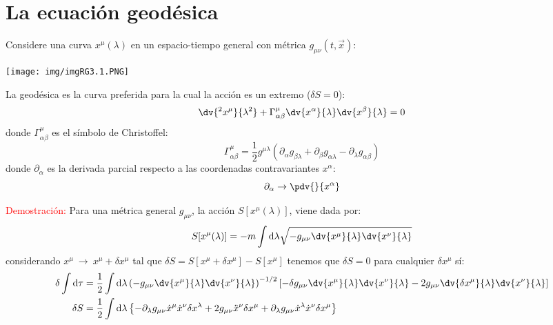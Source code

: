 \documentclass[../main]{subfiles}
\begin{document}
\section{La ecuación geodésica}
Considere una curva $x^{\mu}(\lambda)$ en un espacio-tiempo general con métrica $g_{\mu\nu}(t, \vec{x})$:
\begin{center}
    \texttt{[image: img/imgRG3.1.PNG]}
\end{center}
 La geodésica es la curva preferida para la cual la acción es un extremo ($\delta S=0$):
\begin{equation}
    \dv{^2 x^{\mu}}{\lambda^2}+\Gamma^{\mu}_{\alpha\beta}\dv{x^{\alpha}}{\lambda}\dv{x^{\beta}}{\lambda}=0
\end{equation}
donde $\Gamma^{\mu}_{\alpha\beta}$ es el símbolo de Christoffel:
\begin{equation}
    \Gamma^{\mu}_{\alpha\beta}=\dfrac{1}{2}g^{\mu\lambda}(\partial_{\alpha}g_{\beta\lambda}+\partial_{\beta}g_{\alpha\lambda}-\partial_{\lambda}g_{\alpha\beta})
\end{equation}
donde $\partial_{\alpha}$ es la derivada parcial respecto a las coordenadas contravariantes $x^{\alpha}$:
\begin{equation}
    \partial_{\alpha} \rightarrow \pdv{}{x^{\alpha}}
\end{equation}

\textcolor{red}{Demostración:} Para una métrica general $g_{\mu\nu}$, la acción $S[x^{\mu}(\lambda)]$, viene dada por:
\begin{equation}
    S[x^{\mu}(\lambda)]=-m\int \mathrm{d}\lambda \sqrt{-g_{\mu\nu}\dv{x^{\mu}}{\lambda}\dv{x^{\nu}}{\lambda}}
\end{equation}
considerando $x^{\mu} \ \rightarrow \ x^{\mu}+\delta x^{\mu}$ tal que $\delta S=S[x^{\mu}+\delta x^{\mu}]-S[x^{\mu}]$ tenemos que $\delta S=0$ para cualquier $\delta x^{\mu}$ sí:
\begin{equation}
    \begin{split}
        \delta \int \mathrm{d}\tau&=\dfrac{1}{2}\int \mathrm{d}\lambda \left(-g_{\mu\nu}\dv{x^{\mu}}{\lambda}\dv{x^{\nu}}{\lambda}\right)^{-1/2} \left[-\delta g_{\mu\nu} \dv{x^{\mu}}{\lambda}\dv{x^{\nu}}{\lambda}-2g_{\mu\nu}\dv{\delta x^{\mu}}{\lambda}\dv{x^{\nu}}{\lambda}\right]\\
        \delta S&=\dfrac{1}{2}\int \mathrm{d} \lambda \left\{-\partial_{\lambda}g_{\mu\nu}\dot{x}^{\mu}\dot{x}^{\nu}\delta x^{\lambda}+2g_{\mu\nu}\ddot{x}^{\nu}\delta x^{\mu}+\partial_{\lambda}g_{\mu\nu}\dot{x}^{\lambda}\dot{x}^{\nu}\delta x^{\mu} \right\}
    \end{split}
\end{equation}
\end{document}
